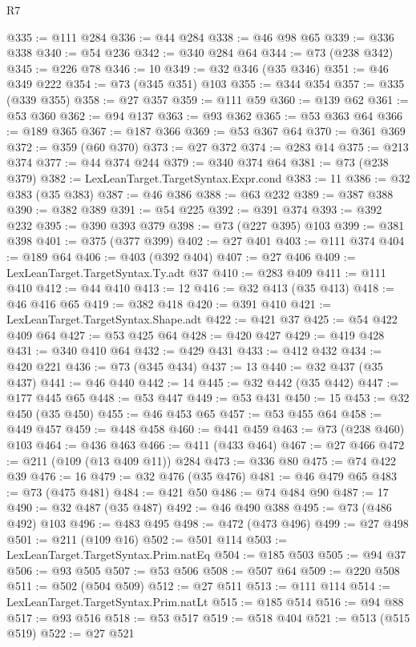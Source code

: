\begin{lexlean}{R7}
\begin{coremodule}
{{{{{{{{{{{{{{{{{{{{{{{{{{{{{{{{{{{{{{{{{{@335 := @111 @284
@336 := @44 @284
@338 := @46 @98 @65
@339 := @336 @338
@340 := @54 @236
@342 := @340 @284 @64
@344 := @73 (@238 @342)
@345 := @226 @78
@346 := 10
@349 := @32 @346 (@35 @346)
@351 := @46 @349 @222
@354 := @73 (@345 @351) @103
@355 := @344 @354
@357 := @335 (@339 @355)
@358 := @27 @357
@359 := @111 @59
@360 := @139 @62
@361 := @53 @360
@362 := @94 @137
@363 := @93 @362
@365 := @53 @363 @64
@366 := @189 @365
@367 := @187 @366
@369 := @53 @367 @64
@370 := @361 @369
@372 := @359 (@60 @370)
@373 := @27 @372
@374 := @283 @14
@375 := @213 @374
@377 := @44 @374 @244
@379 := @340 @374 @64
@381 := @73 (@238 @379)
@382 := LexLeanTarget.TargetSyntax.Expr.cond
@383 := 11
@386 := @32 @383 (@35 @383)
@387 := @46 @386
@388 := @63 @232
@389 := @387 @388
@390 := @382 @389
@391 := @54 @225
@392 := @391 @374
@393 := @392 @232
@395 := @390 @393 @379
@398 := @73 (@227 @395) @103
@399 := @381 @398
@401 := @375 (@377 @399)
@402 := @27 @401
@403 := @111 @374
@404 := @189 @64
@406 := @403 (@392 @404)
@407 := @27 @406
@409 := LexLeanTarget.TargetSyntax.Ty.adt @37
@410 := @283 @409
@411 := @111 @410
@412 := @44 @410
@413 := 12
@416 := @32 @413 (@35 @413)
@418 := @46 @416 @65
@419 := @382 @418
@420 := @391 @410
@421 := LexLeanTarget.TargetSyntax.Shape.adt
@422 := @421 @37
@425 := @54 @422 @409 @64
@427 := @53 @425 @64
@428 := @420 @427
@429 := @419 @428
@431 := @340 @410 @64
@432 := @429 @431
@433 := @412 @432
@434 := @420 @221
@436 := @73 (@345 @434)
@437 := 13
@440 := @32 @437 (@35 @437)
@441 := @46 @440
@442 := 14
@445 := @32 @442 (@35 @442)
@447 := @177 @445 @65
@448 := @53 @447
@449 := @53 @431
@450 := 15
@453 := @32 @450 (@35 @450)
@455 := @46 @453 @65
@457 := @53 @455 @64
@458 := @449 @457
@459 := @448 @458
@460 := @441 @459
@463 := @73 (@238 @460) @103
@464 := @436 @463
@466 := @411 (@433 @464)
@467 := @27 @466
@472 := @211 (@109 (@13 @409 @11)) @284
@473 := @336 @80
@475 := @74 @422 @39
@476 := 16
@479 := @32 @476 (@35 @476)
@481 := @46 @479 @65
@483 := @73 (@475 @481)
@484 := @421 @50
@486 := @74 @484 @90
@487 := 17
@490 := @32 @487 (@35 @487)
@492 := @46 @490 @388
@495 := @73 (@486 @492) @103
@496 := @483 @495
@498 := @472 (@473 @496)
@499 := @27 @498
@501 := @211 (@109 @16)
@502 := @501 @114
@503 := LexLeanTarget.TargetSyntax.Prim.natEq
@504 := @185 @503
@505 := @94 @37
@506 := @93 @505
@507 := @53 @506
@508 := @507 @64
@509 := @220 @508
@511 := @502 (@504 @509)
@512 := @27 @511
@513 := @111 @114
@514 := LexLeanTarget.TargetSyntax.Prim.natLt
@515 := @185 @514
@516 := @94 @88
@517 := @93 @516
@518 := @53 @517
@519 := @518 @404
@521 := @513 (@515 @519)
@522 := @27 @521
}}}}}}}}}}}}}}}}}}}}}}}}}}}}}}}}}}}}}}}}}}
\end{coremodule}
\end{lexlean}

